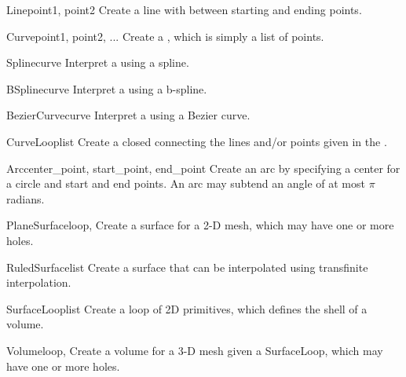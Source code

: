\begin{classdesc}{Line}{point1, point2}
Create a line with between starting and ending points.
\end{classdesc}

\begin{classdesc}{Curve}{point1, point2, ...}
Create a , which is simply a list of points.
\end{classdesc}

\begin{classdesc}{Spline}{curve}
Interpret a  using a spline.
\end{classdesc}

\begin{classdesc}{BSpline}{curve}
Interpret a  using a b-spline.
\end{classdesc}

\begin{classdesc}{BezierCurve}{curve}
Interpret a  using a Bezier curve.
\end{classdesc}

\begin{classdesc}{CurveLoop}{list}
Create a closed  connecting the lines and/or points given in the .
\end{classdesc}

\begin{classdesc}{Arc}{center_point, start_point, end_point}
Create an arc by specifying a center for a circle and start and end points. An arc may subtend an angle of at most $\pi$ radians.
\end{classdesc}

\begin{classdesc}{PlaneSurface}{loop, }
Create a surface for a 2-D mesh, which may have one or more holes.
\end{classdesc}

\begin{classdesc}{RuledSurface}{list}
Create a surface that can be interpolated using transfinite interpolation.
\end{classdesc}

\begin{classdesc}{SurfaceLoop}{list}
Create a loop of 2D primitives, which defines the shell of a volume.
\end{classdesc}

\begin{classdesc}{Volume}{loop, }
Create a volume for a 3-D mesh given a SurfaceLoop, which may have one or more holes.
\end{classdesc}

